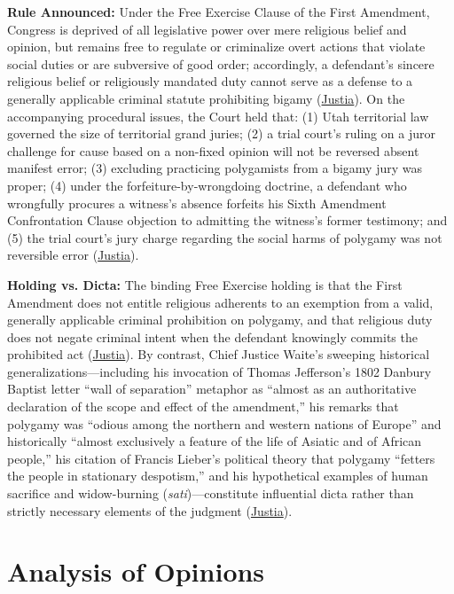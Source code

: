 \documentclass[12pt]{article}
\begin{document}
\textbf{Rule Announced:} Under the Free Exercise Clause of the First Amendment, Congress is deprived of all legislative power over mere religious belief and opinion, but remains free to regulate or criminalize overt actions that violate social duties or are subversive of good order; accordingly, a defendant's sincere religious belief or religiously mandated duty cannot serve as a defense to a generally applicable criminal statute prohibiting bigamy (\href{https://supreme.justia.com/cases/federal/us/98/145/}{Justia}). On the accompanying procedural issues, the Court held that: (1) Utah territorial law governed the size of territorial grand juries; (2) a trial court's ruling on a juror challenge for cause based on a non-fixed opinion will not be reversed absent manifest error; (3) excluding practicing polygamists from a bigamy jury was proper; (4) under the forfeiture-by-wrongdoing doctrine, a defendant who wrongfully procures a witness's absence forfeits his Sixth Amendment Confrontation Clause objection to admitting the witness's former testimony; and (5) the trial court's jury charge regarding the social harms of polygamy was not reversible error (\href{https://supreme.justia.com/cases/federal/us/98/145/}{Justia}).

\textbf{Holding vs. Dicta:} The binding Free Exercise holding is that the First Amendment does not entitle religious adherents to an exemption from a valid, generally applicable criminal prohibition on polygamy, and that religious duty does not negate criminal intent when the defendant knowingly commits the prohibited act (\href{https://supreme.justia.com/cases/federal/us/98/145/}{Justia}). By contrast, Chief Justice Waite's sweeping historical generalizations---including his invocation of Thomas Jefferson's 1802 Danbury Baptist letter ``wall of separation'' metaphor as ``almost as an authoritative declaration of the scope and effect of the amendment,'' his remarks that polygamy was ``odious among the northern and western nations of Europe'' and historically ``almost exclusively a feature of the life of Asiatic and of African people,'' his citation of Francis Lieber's political theory that polygamy ``fetters the people in stationary despotism,'' and his hypothetical examples of human sacrifice and widow-burning (\textit{sati})---constitute influential dicta rather than strictly necessary elements of the judgment (\href{https://supreme.justia.com/cases/federal/us/98/145/}{Justia}).

\section{Analysis of Opinions}
\end{document}
